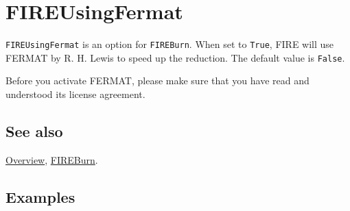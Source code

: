 \documentclass[../FeynHelpersManual.tex]{subfiles}
\begin{document}
\hypertarget{fireusingfermat}{
\section{FIREUsingFermat}\label{fireusingfermat}}

\texttt{FIREUsingFermat} is an option for \texttt{FIREBurn}. When set to
\texttt{True}, FIRE will use FERMAT by R. H. Lewis to speed up the
reduction. The default value is \texttt{False}.

Before you activate FERMAT, please make sure that you have read and
understood its license agreement.

\subsection{See also}

\hyperlink{toc}{Overview}, \hyperlink{fireburn}{FIREBurn}.

\subsection{Examples}
\end{document}
